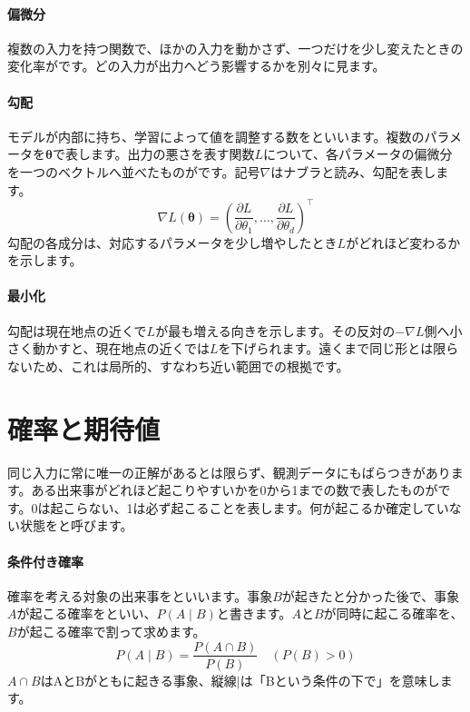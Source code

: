\paragraph{偏微分}
        複数の入力を持つ関数で、ほかの入力を動かさず、一つだけを少し変えたときの変化率がです。どの入力が出力へどう影響するかを別々に見ます。

\par
\endgroup
\medskip
\begingroup
\paragraph{勾配}
        モデルが内部に持ち、学習によって値を調整する数をといいます。複数のパラメータを$\boldsymbol{\theta}$で表します。出力の悪さを表す関数$L$について、各パラメータの偏微分を一つのベクトルへ並べたものがです。記号$\nabla$はナブラと読み、勾配を表します。
        \[
          \nabla L(\boldsymbol{\theta})=
          \left(
          \frac{\partial L}{\partial\theta_1},\ldots,
          \frac{\partial L}{\partial\theta_d}
          \right)^\top
        \]
        勾配の各成分は、対応するパラメータを少し増やしたとき$L$がどれほど変わるかを示します。

\paragraph{最小化}
        勾配は現在地点の近くで$L$が最も増える向きを示します。その反対の$-\nabla L$側へ小さく動かすと、現在地点の近くでは$L$を下げられます。遠くまで同じ形とは限らないため、これは局所的、すなわち近い範囲での根拠です。

\par
\endgroup
\par
\endgroup


\section{確率と期待値}
\label{sec:06-machine-learning-03}

同じ入力に常に唯一の正解があるとは限らず、観測データにもばらつきがあります。ある出来事がどれほど起こりやすいかを0から1までの数で表したものがです。0は起こらない、1は必ず起こることを表します。何が起こるか確定していない状態をと呼びます。

\begingroup
\begingroup
\paragraph{条件付き確率}
        確率を考える対象の出来事をといいます。事象$B$が起きたと分かった後で、事象$A$が起こる確率をといい、$P(A\mid B)$と書きます。$A$と$B$が同時に起こる確率を、$B$が起こる確率で割って求めます。
        \[
          P(A\mid B)=\frac{P(A\cap B)}{P(B)}
          \quad (P(B)>0)
        \]
        $A\cap B$はAとBがともに起きる事象、縦線$\mid$は「Bという条件の下で」を意味します。

